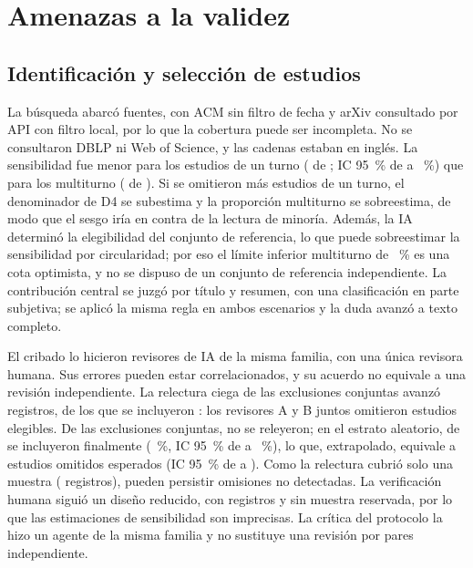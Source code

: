 \section{Amenazas a la validez}
\label{sec:amenazas}

\subsection{Identificación y selección de estudios}
\label{sec:am-seleccion}

La búsqueda abarcó \nBases{} fuentes, con ACM sin filtro de fecha y arXiv consultado por API con filtro local, por lo que la cobertura puede ser incompleta. No se consultaron DBLP ni Web of Science, y las cadenas estaban en inglés. La sensibilidad fue menor para los estudios de un turno (\nRefUTHallados{} de \nRefUT{}; IC 95~\% de \sensUTInf{} a \sensUTSup~\%) que para los multiturno (\nRefMTHallados{} de \nRefMT{}). Si se omitieron más estudios de un turno, el denominador de D4 se subestima y la proporción multiturno se sobreestima, de modo que el sesgo iría en contra de la lectura de minoría. Además, la IA determinó la elegibilidad del conjunto de referencia, lo que puede sobreestimar la sensibilidad por circularidad; por eso el límite inferior multiturno de ~\% es una cota optimista, y no se dispuso de un conjunto de referencia independiente. La contribución central se juzgó por título y resumen, con una clasificación en parte subjetiva; se aplicó la misma regla en ambos escenarios y la duda avanzó a texto completo.

El cribado lo hicieron revisores de IA de la misma familia, con una única revisora humana. Sus errores pueden estar correlacionados, y su acuerdo no equivale a una revisión independiente. La relectura ciega de las exclusiones conjuntas avanzó \nQCAvanzados{} registros, de los que se incluyeron \nQCIncluidos{}: los revisores A y B juntos omitieron estudios elegibles. De las \nConjuntas{} exclusiones conjuntas, \nNoReleidas{} no se releyeron; en el estrato aleatorio, \nRescAleat{} de \nAleatRel{} se incluyeron finalmente (\tasaRescate~\%, IC 95~\% de \tasaRescateInf{} a \tasaRescateSup~\%), lo que, extrapolado, equivale a \omisEsp{} estudios omitidos esperados (IC 95~\% de \omisEspInf{} a \omisEspSup{}). Como la relectura cubrió solo una muestra (\nQC{} registros), pueden persistir omisiones no detectadas. La verificación humana siguió un diseño reducido, con \nPiloto{} registros y sin muestra reservada, por lo que las estimaciones de sensibilidad son imprecisas. La crítica del protocolo la hizo un agente de la misma familia y no sustituye una revisión por pares independiente.

